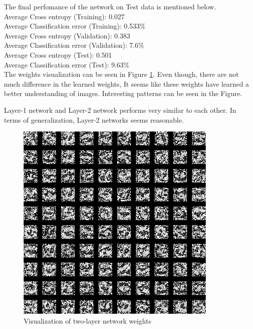 \documentclass{article}
\begin{document}
The final perfomance of the network on Test data is mentioned below. \\

Average Cross entropy (Training): 0.027 \\
Average Classification error (Training): 0.533\% \\

Average Cross entropy (Validation): 0.383 \\
Average Classification error (Validation): 7.6\% \\

Average Cross entropy (Test): 0.501 \\
Average Classification error (Test): 9.63\% \\

The weights visualization can be seen in Figure \ref{fig:5h}. Even though, there are not much difference in the learned weights, It seems like these weights have learned a better understanding of images. Interesting patterns can be seen in the Figure.

Layer-1 network and Layer-2 network performs very similar to each other. In terms of generalization, Layer-2 networks seems reasonable.

\begin{figure}[!h]
  \centering
  \includegraphics[width=\textwidth]{figures/5h}
  \caption{Visualization of two-layer network weights}
  \label{fig:5h}
\end{figure}
\end{document}
